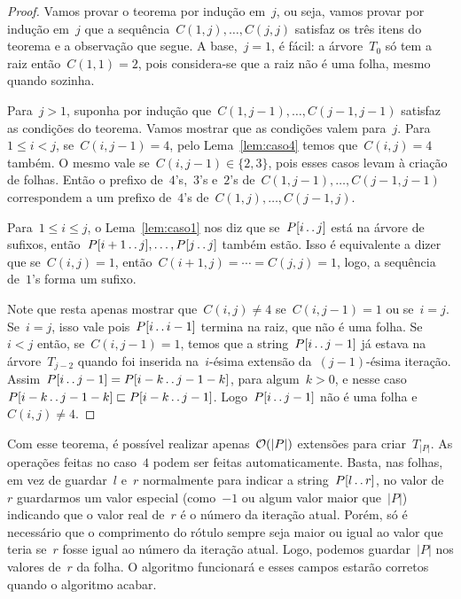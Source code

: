 \begin{proof}
Vamos provar o teorema por indução em~$j$, ou seja, vamos provar por indução em~$j$ que a sequência~$C(1, j), \ldots, C(j, j)$ satisfaz os três itens do teorema e a observação que segue. A base,~$j = 1$, é fácil: a árvore~$T_0$ só tem a raiz então~$C(1, 1) = 2$, pois considera-se que a raiz não é uma folha, mesmo quando sozinha.

Para~$j > 1$, suponha por indução que~$C(1, j-1), \ldots, C(j-1, j-1)$ satisfaz as condições do teorema. Vamos mostrar que as condições valem para~$j$.
Para~${1 \leq i < j}$, se~$C(i, j - 1) = 4$, pelo Lema~\ref{lem:caso4} temos que~$C(i, j) = 4$ também. O mesmo vale se~${C(i, j - 1) \in \{2, 3\}}$, pois esses casos levam à criação de folhas. Então o prefixo de~$4$'s,~$3$'s e~$2$'s de~$C(1, j-1), \ldots, C(j - 1, j - 1)$ correspondem a um prefixo de~$4$'s de~$C(1, j), \ldots, C(j - 1, j)$.

Para~$1 \leq i \leq j$, o Lema~\ref{lem:caso1} nos diz que se~$P[i\,.\,.\, j]$ está na árvore de sufixos, então~${P[i+1\,.\,.\, j], \ldots, P[j\,.\,.\, j]}$ também estão. Isso é equivalente a dizer que se~$C(i, j) = 1$, então~$C(i + 1, j) = \cdots = C(j, j) = 1$, logo, a sequência de~$1$'s forma um sufixo.

Note que resta apenas mostrar que~$C(i, j) \neq 4$ se~$C(i, j - 1) = 1$ ou se~$i = j$. Se~$i = j$, isso vale pois~$P[i\,.\,.\, i-1]$ termina na raiz, que não é uma folha. Se~$i < j$ então, se~$C(i, j - 1) = 1$, temos que a string~$P[i\,.\,.\, j-1]$ já estava na árvore~$T_{j-2}$ quando foi inserida na~$i$-ésima extensão da~${(j-1)\text{-ésima}}$ iteração. Assim~${P[i\,.\,.\, j-1] = P[i-k\,.\,.\, j-1-k]}$, para algum~$k > 0$, e nesse caso~$P[i-k\,.\,.\, j-1-k] \sqsubset P[i-k\,.\,.\, j-1]$. Logo~$P[i\,.\,.\, j-1]$ não é uma folha e~$C(i, j) \neq 4$.
\end{proof}

Com esse teorema, é possível realizar apenas~$\mathcal{O}(|P|)$ extensões para criar~$T_{|P|}$. As operações feitas no caso~$4$ podem ser feitas automaticamente. Basta, nas folhas, em vez de guardar~$l$ e~$r$ normalmente para indicar a string~$P[l\,.\,.\, r]$, no valor de~$r$ guardarmos um valor especial (como~$-1$ ou algum valor maior que~$|P|$) indicando que o valor real de~$r$ é o número da iteração atual. Porém, só é necessário que o comprimento do rótulo sempre seja maior ou igual ao valor que teria se~$r$ fosse igual ao número da iteração atual. Logo, podemos guardar~$|P|$ nos valores de~$r$ da folha. O algoritmo funcionará e esses campos estarão corretos quando o algoritmo acabar.

